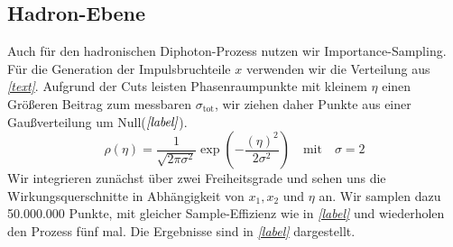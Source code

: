 \subsection{Hadron-Ebene}
Auch für den hadronischen Diphoton-Prozess nutzen wir Importance-Sampling. Für die Generation der Impulsbruchteile $x$ verwenden wir die Verteilung aus \textit{\autoref{text}}. Aufgrund der Cuts leisten Phasenraumpunkte mit kleinem $\eta$ einen Größeren Beitrag zum messbaren $\sigma_{\text{tot}}$, wir ziehen daher Punkte aus einer Gaußverteilung um Null($\textit{\autoref{label}}$).
\begin{equation}
\rho(\eta) = \frac{1}{\sqrt{2\pi \sigma^2}} \exp(-\frac{(\eta)^2}{2\sigma^2}) \quad \text{mit} \quad \sigma=2
\end{equation}
Wir integrieren zunächst über zwei Freiheitsgrade und sehen uns die Wirkungsquerschnitte in Abhängigkeit von $x_1, x_2$ und $\eta$ an. Wir samplen dazu 50.000.000 Punkte, mit gleicher Sample-Effizienz wie in \textit{\autoref{label}} und wiederholen den Prozess fünf mal. Die Ergebnisse sind in \textit{\autoref{label}} dargestellt.
